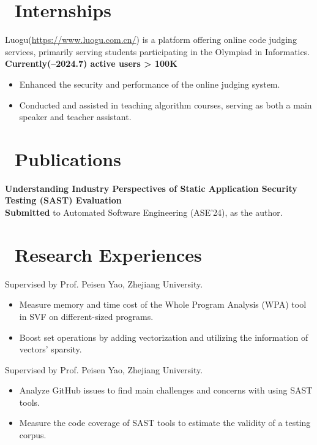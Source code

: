 \documentclass{resume}
\begin{document}
\section{\faUsers\ Internships}
Luogu(\url{https://www.luogu.com.cn/}) is a platform offering online code judging services, primarily serving students participating in the Olympiad in Informatics.\\
\textbf{Currently(--2024.7) active users > 100K}
\begin{itemize}
  \item Enhanced the security and performance of the online judging system.
  \item Conducted and assisted in teaching algorithm courses, serving as both a main speaker and teacher assistant.
\end{itemize}

\section{\faBookmarkO\ Publications}
\textbf{Understanding Industry Perspectives of Static Application Security Testing (SAST) Evaluation}\\
\textbf{Submitted} to Automated Software Engineering (ASE'24), as the  author.

\section{\faSearch\ Research Experiences}
Supervised by Prof. Peisen Yao, Zhejiang University.
\begin{itemize}
  \item Measure memory and time cost of the Whole Program Analysis (WPA) tool in SVF on different-sized programs.
  \item Boost set operations by adding vectorization and utilizing the information of vectors' sparsity.
\end{itemize}

Supervised by Prof. Peisen Yao, Zhejiang University.
\begin{itemize}
  \item Analyze GitHub issues to find main challenges and concerns with using SAST tools.
  \item Measure the code coverage of SAST tools to estimate the validity of a testing corpus.
\end{itemize}
\end{document}
